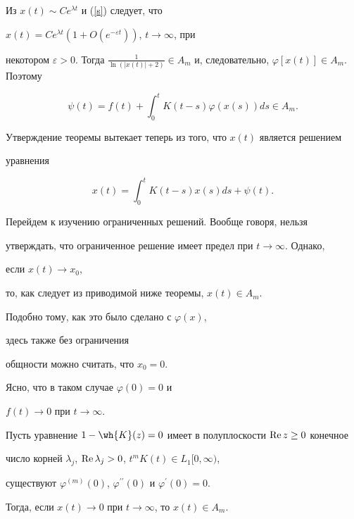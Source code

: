 Из $x(t)\sim Ce^{\lambda t}$ и (\ref{s}) следует, что


$x(t)=C e^{\lambda t}(1+O(e^{-\varepsilon t}))$, $t\to\infty$, при


некотором $\varepsilon>0$. Тогда $\frac{1}{\ln(|x(t)|+2)}


\in A_m$ и, следовательно, $\varphi[x(t)] \in A_m$. Поэтому


$$


\psi(t)=f(t)+\int_0^t K(t-s)\varphi(x(s))ds\in A_m.


$$


Утверждение теоремы вытекает теперь из того, что $x(t)$ является решением


уравнения


$$


x(t)=\int_0^t K(t-s)x(s)ds+\psi(t).


$$





Перейдем к изучению ограниченных решений. Вообще говоря, нельзя


утверждать, что ограниченное решение имеет предел при $t\to\infty$. Однако,


если $x(t)\to x_0$,


то, как следует из приводимой ниже теоремы, $x(t) \in A_m$.


Подобно тому, как это было сделано с $\varphi(x)$,


здесь также без ограничения


общности можно считать, что $x_0=0$.


Ясно, что в таком случае $\varphi(0)=0$ и


$f(t) \to 0$ при $t \to \infty$.





\begin{thm}


Пусть уравнение $1-\wh{K}(z)=0$ имеет в полуплоскости $\operatorname{Re} z\ge0$ конечное


число корней $\lambda_j$, $\operatorname{Re}\lambda_j>0$, $t^m K(t) \in L_1[0,\infty)$,


существуют $\varphi^{(m)}(0)$, $\varphi^{\prime \prime}(0)$ и $\varphi^\prime


(0)=0$.


Тогда, если $x(t) \to 0$ при $t \to \infty$, то $x(t) \in A_m$.


\end{thm}






